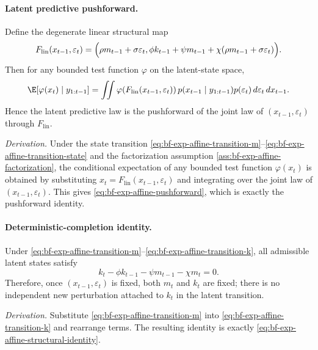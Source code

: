 \paragraph{Latent predictive pushforward.}
\label{lem:bf-exp-affine-latent-pushforward}
Define the degenerate linear structural map
\begin{equation}
  F_{\mathrm{lin}}(x_{t-1},\varepsilon_t)
  =
  \Bigl(
    \rho m_{t-1}+\sigma\varepsilon_t,
    \phi k_{t-1}+\psi m_{t-1}+\chi(\rho m_{t-1}+\sigma\varepsilon_t)
  \Bigr).
  \label{eq:bf-exp-affine-latent-map}
\end{equation}
Then for any bounded test function $\varphi$ on the latent-state space,
\begin{equation}
  \E\!\left[\varphi(x_t)\mid y_{1:t-1}\right]
  =
  \iint
  \varphi\!\left(F_{\mathrm{lin}}(x_{t-1},\varepsilon_t)\right)
  p(x_{t-1}\mid y_{1:t-1})p(\varepsilon_t)
  \, d\varepsilon_t \, dx_{t-1}.
  \label{eq:bf-exp-affine-pushforward}
\end{equation}
Hence the latent predictive law is the pushforward of the joint law of
$(x_{t-1},\varepsilon_t)$ through $F_{\mathrm{lin}}$.

\emph{Derivation.}
Under the state transition
\eqref{eq:bf-exp-affine-transition-m}--\eqref{eq:bf-exp-affine-transition-state}
and the factorization assumption
\eqref{ass:bf-exp-affine-factorization}, the conditional expectation of any
bounded test function $\varphi(x_t)$ is obtained by substituting
$x_t=F_{\mathrm{lin}}(x_{t-1},\varepsilon_t)$ and integrating over the joint law
of $(x_{t-1},\varepsilon_t)$.  This gives
\eqref{eq:bf-exp-affine-pushforward}, which is exactly the pushforward identity.

\paragraph{Deterministic-completion identity.}
\label{lem:bf-exp-affine-deterministic-completion}
Under \eqref{eq:bf-exp-affine-transition-m}--\eqref{eq:bf-exp-affine-transition-k},
all admissible latent states satisfy
\begin{equation}
  k_t - \phi k_{t-1} - \psi m_{t-1} - \chi m_t = 0.
  \label{eq:bf-exp-affine-structural-identity}
\end{equation}
Therefore, once $(x_{t-1},\varepsilon_t)$ is fixed, both $m_t$ and $k_t$ are
fixed; there is no independent new perturbation attached to $k_t$ in the latent
transition.

\emph{Derivation.}
Substitute \eqref{eq:bf-exp-affine-transition-m} into
\eqref{eq:bf-exp-affine-transition-k} and rearrange terms.  The resulting
identity is exactly \eqref{eq:bf-exp-affine-structural-identity}.

